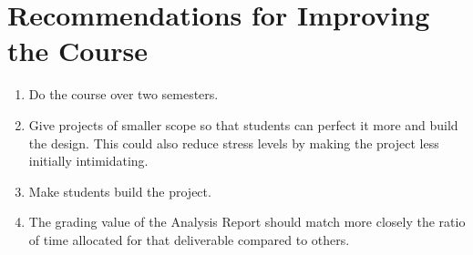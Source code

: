 \section{Recommendations for Improving the Course}

\begin{enumerate}
    \item Do the course over two semesters.
    \item Give projects of smaller scope so that students can perfect it more and build the design. This could also reduce stress levels by making the project less initially intimidating.
    \item Make students build the project.
    \item The grading value of the Analysis Report should match more closely the ratio of time allocated for that deliverable compared to others.
\end{enumerate}